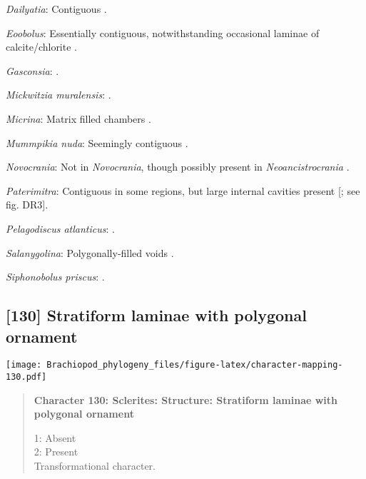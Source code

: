 \documentclass[openany]{book}
\theoremstyle{definition}
\theoremstyle{definition}
\theoremstyle{definition}
\theoremstyle{remark}
\begin{document}
\hypertarget{Dailyatia-coding-129}{}
\emph{Dailyatia}: Contiguous \citep[figs. 54--55]{Skovsted2015Theearly}.

\hypertarget{Eoobolus-coding-129}{}
\emph{Eoobolus}: Essentially contiguous, notwithstanding occasional
laminae of calcite/chlorite \citep{Balthasar2007Anearly}.

\hypertarget{Gasconsia-coding-129}{}
\emph{Gasconsia}: \citet{Hanken1985Thetaxonomy}.

\hypertarget{Mickwitzia_muralensis-coding-129}{}
\emph{Mickwitzia muralensis}: \citep{Balthasar2004Shellstructure}.

\hypertarget{Micrina-coding-129}{}
\emph{Micrina}: Matrix filled chambers \citep[fig.
DR1]{Balthasar2009Homologousskeletal}.

\hypertarget{Mummpikia_nuda-coding-129}{}
\emph{Mummpikia nuda}: Seemingly contiguous
\citep{Balthasar2008iMummpikia}.

\hypertarget{Novocrania-coding-129}{}
\emph{Novocrania}: Not in \emph{Novocrania}, though possibly present in
\emph{Neoancistrocrania} \citep{Parkinson2005}.

\hypertarget{Paterimitra-coding-129}{}
\emph{Paterimitra}: Contiguous in some regions, but large internal
cavities present {[}\citet{Balthasar2009Homologousskeletal}; see fig.
DR3{]}.

\hypertarget{Pelagodiscus_atlanticus-coding-129}{}
\emph{Pelagodiscus atlanticus}: \citet{Williams1998Chemicostructural}.

\hypertarget{Salanygolina-coding-129}{}
\emph{Salanygolina}: Polygonally-filled voids
\citep{Holmer2009Theenigmatic}.

\hypertarget{Siphonobolus_priscus-coding-129}{}
\emph{Siphonobolus priscus}: \citep{Williams2004Chemicostructure}.

\subsection*{{[}130{]} Stratiform laminae with polygonal
ornament}\label{stratiform-laminae-with-polygonal-ornament}

\texttt{[image: Brachiopod\_phylogeny\_files/figure-latex/character-mapping-130.pdf]}

\begin{quote}
\textbf{Character 130: Sclerites: Structure: Stratiform laminae with
polygonal ornament}

1: Absent\\
2: Present\\
Transformational character.
\end{quote}
\end{document}
